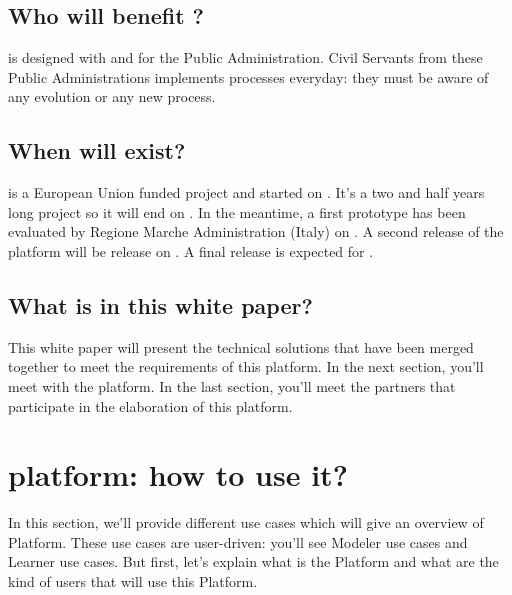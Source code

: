 \documentclass{learnpad}
\begin{document}
\section{Who will benefit \learnpad?}
\learnpad is designed with and for the Public Administration.  Civil Servants
from these Public Administrations implements processes everyday: they must be
aware of any evolution or any new process.

\section{When will \learnpad exist?}
\learnpad is a European Union funded project and started on
.  It's a two and half years long project so it will end
on .  In the meantime, a first prototype has been
evaluated by Regione Marche Administration (Italy) on .  A
second release of the platform will be release on .  A
final release is expected for .

\section{What is in this white paper?}
This white paper will present the technical solutions that have been merged
together to meet the requirements of this \learnpad platform.  In the next
section, you'll meet with the \learnpad platform.  In the last section, you'll
meet the partners that participate in the elaboration of this \learnpad
platform.

\chapter{\learnpad platform: how to use it?}
In this section, we'll provide different use cases which will give an overview
of \learnpad Platform.  These use cases are user-driven: you'll see Modeler use
cases and Learner use cases.  But first, let's explain what is the \learnpad
Platform and what are the kind of users that will use this \learnpad Platform.
\end{document}
